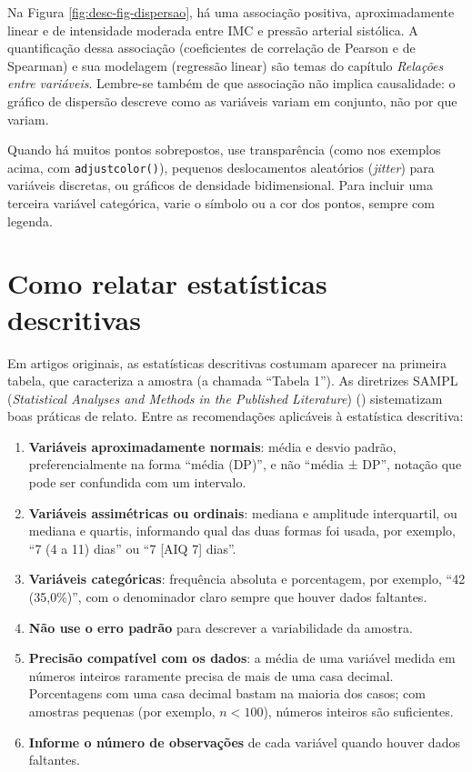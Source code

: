 \documentclass[
]{book}
\providecommand{\tightlist}{%
  \setlength{\itemsep}{0pt}\setlength{\parskip}{0pt}}
\begin{document}
Na Figura \ref{fig:desc-fig-dispersao}, há uma associação positiva, aproximadamente linear e de intensidade moderada entre IMC e pressão arterial sistólica. A quantificação dessa associação (coeficientes de correlação de Pearson e de Spearman) e sua modelagem (regressão linear) são temas do capítulo \emph{Relações entre variáveis}. Lembre-se também de que associação não implica causalidade: o gráfico de dispersão descreve como as variáveis variam em conjunto, não por que variam.

Quando há muitos pontos sobrepostos, use transparência (como nos exemplos acima, com \texttt{adjustcolor()}), pequenos deslocamentos aleatórios (\emph{jitter}) para variáveis discretas, ou gráficos de densidade bidimensional. Para incluir uma terceira variável categórica, varie o símbolo ou a cor dos pontos, sempre com legenda.

\section{Como relatar estatísticas descritivas}\label{como-relatar-estatuxedsticas-descritivas}

Em artigos originais, as estatísticas descritivas costumam aparecer na primeira tabela, que caracteriza a amostra (a chamada ``Tabela 1''). As diretrizes SAMPL (\emph{Statistical Analyses and Methods in the Published Literature}) () sistematizam boas práticas de relato. Entre as recomendações aplicáveis à estatística descritiva:

\begin{enumerate}
\def\labelenumi{\arabic{enumi}.}
\tightlist
\item
  \textbf{Variáveis aproximadamente normais}: média e desvio padrão, preferencialmente na forma ``média (DP)'', e não ``média ± DP'', notação que pode ser confundida com um intervalo.
\item
  \textbf{Variáveis assimétricas ou ordinais}: mediana e amplitude interquartil, ou mediana e quartis, informando qual das duas formas foi usada, por exemplo, ``7 (4 a 11) dias'' ou ``7 {[}AIQ 7{]} dias''.
\item
  \textbf{Variáveis categóricas}: frequência absoluta e porcentagem, por exemplo, ``42 (35,0\%)'', com o denominador claro sempre que houver dados faltantes.
\item
  \textbf{Não use o erro padrão} para descrever a variabilidade da amostra.
\item
  \textbf{Precisão compatível com os dados}: a média de uma variável medida em números inteiros raramente precisa de mais de uma casa decimal. Porcentagens com uma casa decimal bastam na maioria dos casos; com amostras pequenas (por exemplo, \(n < 100\)), números inteiros são suficientes.
\item
  \textbf{Informe o número de observações} de cada variável quando houver dados faltantes.
\end{enumerate}
\end{document}
